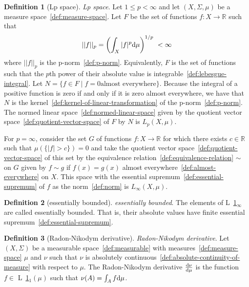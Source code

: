 \documentclass[12pt,a4paper]{article}
\theoremstyle{definition}
\newtheorem{definition}{Definition}
\begin{document}
\begin{definition}[Lp space]\label{def:lp-space}
\emph{Lp space}. Let $1\leq p < \infty$ and let $(X,\Sigma, \mu)$ be a measure space~\ref{def:measure-space}. Let $F$ be the set of functions $f: X\to \mathbb R$ such that $$\vert \vert f\vert \vert _p = \left(\int_X\vert f\vert ^p\text d\mu\right)^{1/p}\ < \infty$$ where $\vert \vert f\vert \vert _p$ is the p-norm~\ref{def:p-norm}. Equivalently, $F$ is the set of functions such that the $p$th power of their absolute value is integrable~\ref{def:lebesgue-integral}. Let $N = \{f \in F \mid f = 0 \text{almost everywhere}\}$. Because the integral of a positive function is zero if and only if it is zero almost everywhere, we have that $N$ is the kernel~\ref{def:kernel-of-linear-transformation} of the p-norm~\ref{def:p-norm}. The normed linear space~\ref{def:normed-linear-space} given by the quotient vector space~\ref{def:quotient-vector-space} of $F$ by $N$ is $L_p(X,\mu)$.

For $p = \infty$, consider the set $G$ of functions $f:X \to \mathbb R$  for which there exists $c \in\mathbb R$ such that $\mu(\{\vert f\vert  > c\}) = 0$ and take the quotient vector space~\ref{def:quotient-vector-space} of this set by the equivalence relation~\ref{def:equivalence-relation} $\sim$ on $G$ given by $f\sim g$ if $f(x) = g(x)$ almost everywhere~\ref{def:almost-everywhere} on $X$.  This space with the essential supremum~\ref{def:essential-supremum} of $f$ as the norm~\ref{def:norm} is $L_\infty(X,\mu)$.
\end{definition}

\begin{definition}[essentially bounded]\label{def:essentially-bounded}
\emph{essentially bounded}. The elements of L~\ref{def:lp-space}$_\infty$ are called essentially bounded. That is, their absolute values have finite essential supremum~\ref{def:essential-supremum}.
\end{definition}

\begin{definition}[Radon-Nikodym derivative]\label{def:radon-nikodym-derivative}
\emph{Radon-Nikodym derivative}. Let $(X,\Sigma)$ be a measurable space~\ref{def:measurable} with measures~\ref{def:measure-space} $\mu$ and $\nu$ such that $\nu$ is absolutely continuous~\ref{def:absolute-continuity-of-measure} with respect to $\mu$. The Radon-Nikodym derivative $\frac{\text d\nu}{\text d\mu}$ is the function $f \in$ L~\ref{def:lp-space}$_1(\mu)$ such that $\nu(A) = \int_A f\text d\mu$.
\end{definition}
\end{document}
